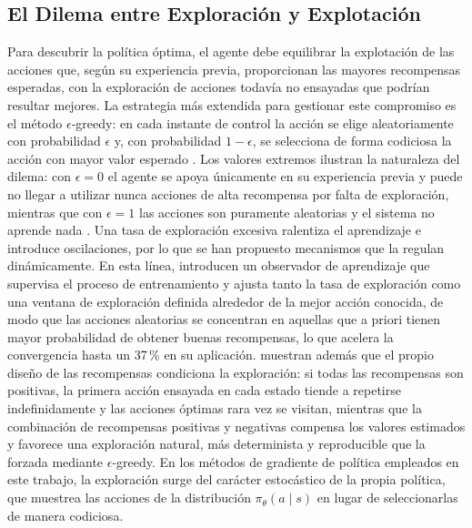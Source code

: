 \subsection{El Dilema entre Exploración y Explotación}\label{sec:exploracion-explotacion}
Para descubrir la política óptima, el agente debe equilibrar la explotación de las acciones que, según su experiencia previa, proporcionan las mayores recompensas esperadas, con la exploración de acciones todavía no ensayadas que podrían resultar mejores. La estrategia más extendida para gestionar este compromiso es el método $\epsilon$-greedy: en cada instante de control la acción se elige aleatoriamente con probabilidad $\epsilon$ y, con probabilidad $1-\epsilon$, se selecciona de forma codiciosa la acción con mayor valor esperado \citep{sierragarcia2020exploring, sierragarcia2024federated}. Los valores extremos ilustran la naturaleza del dilema: con $\epsilon = 0$ el agente se apoya únicamente en su experiencia previa y puede no llegar a utilizar nunca acciones de alta recompensa por falta de exploración, mientras que con $\epsilon = 1$ las acciones son puramente aleatorias y el sistema no aprende nada \citep{sierragarcia2024federated}. Una tasa de exploración excesiva ralentiza el aprendizaje e introduce oscilaciones, por lo que se han propuesto mecanismos que la regulan dinámicamente. En esta línea, \citet{sierragarcia2022wind} introducen un observador de aprendizaje que supervisa el proceso de entrenamiento y ajusta tanto la tasa de exploración como una ventana de exploración definida alrededor de la mejor acción conocida, de modo que las acciones aleatorias se concentran en aquellas que a priori tienen mayor probabilidad de obtener buenas recompensas, lo que acelera la convergencia hasta un 37\,\% en su aplicación. \citet{sierragarcia2020exploring} muestran además que el propio diseño de las recompensas condiciona la exploración: si todas las recompensas son positivas, la primera acción ensayada en cada estado tiende a repetirse indefinidamente y las acciones óptimas rara vez se visitan, mientras que la combinación de recompensas positivas y negativas compensa los valores estimados y favorece una exploración natural, más determinista y reproducible que la forzada mediante $\epsilon$-greedy. En los métodos de gradiente de política empleados en este trabajo, la exploración surge del carácter estocástico de la propia política, que muestrea las acciones de la distribución $\pi_\theta(a \mid s)$ en lugar de seleccionarlas de manera codiciosa.

